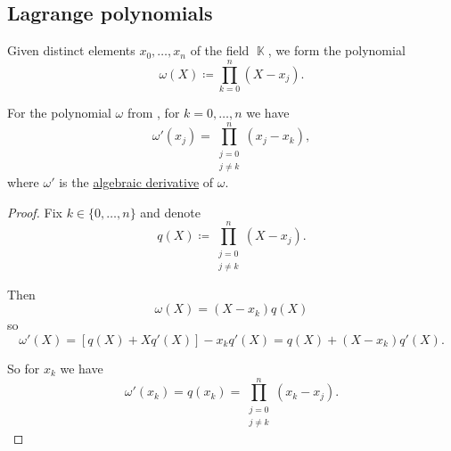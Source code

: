 \subsection{Lagrange polynomials}\label{subsec:lagrange_polynomials}

\begin{definition}\label{def:omega_polynomial}
  Given distinct elements \( x_0, \ldots, x_n \) of the field \( \BbbK \), we form the polynomial
  \begin{equation*}
    \omega(X) \coloneqq \prod_{k=0}^n (X - x_j).
  \end{equation*}
\end{definition}

\begin{proposition}\label{thm:omega_polynomial_derivative}
  For the polynomial \( \omega \) from , for \( k = 0, \ldots, n \) we have
  \begin{equation*}
    \omega'(x_j) = \prod_{\substack{j = 0 \\ j \neq k}}^n (x_j - x_k),
  \end{equation*}
  where \( \omega' \) is the \hyperref[def:algebraic_derivative]{algebraic derivative} of \( \omega \).
\end{proposition}
\begin{proof}
  Fix \( k \in \{ 0, \ldots, n \} \) and denote
  \begin{equation*}
    q(X) \coloneqq \prod_{\substack{j = 0 \\ j \neq k}}^n (X - x_j).
  \end{equation*}

  Then
  \begin{equation*}
    \omega(X) = (X - x_k) q(X)
  \end{equation*}
  so
  \begin{equation*}
    \omega'(X) = [q(X) + X q'(X)] - x_k q'(X) = q(X) + (X - x_k) q'(X).
  \end{equation*}

  So for \( x_k \) we have
  \begin{equation*}
    \omega'(x_k) = q(x_k) = \prod_{\substack{j = 0 \\ j \neq k}}^n (x_k - x_j).
  \end{equation*}
\end{proof}

